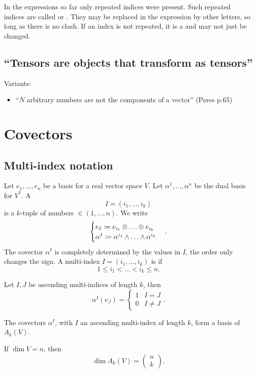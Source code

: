 In the expressions so far only repeated indices were present. Such repeated indices are called   or . They may be replaced in the expression by other letters, so long as there is no clash. If an index is not repeated, it is a  and may not just be changed.

\subsection{``Tensors are objects that transform as tensors''}
Variants:
\begin{itemize}
\item ``$N$ arbitrary numbers are not the components of a vector'' (Peres p.65)
\end{itemize}


\section{Covectors}

\subsection{Multi-index notation}
Let $e_1,\ldots, e_n$ be a basis for a real vector space $V$. Let $\alpha^1,\ldots, \alpha^n$ be the dual basis for $V^*$. A 
\[ I = (i_1,\ldots,i_k)\]
is a $k$-tuple of numbers $\in (1,\ldots,n)$. We write
\[ \begin{cases}
e_I \coloneqq e_{i_1}\otimes\ldots\otimes e_{i_k}\\
\alpha^I \coloneqq \alpha^{i_1}\wedge\ldots \wedge\alpha^{i_k}
\end{cases}. \]
The covector $\alpha^I$ is completely determined by the values in $I$, the order only changes the sign. A multi-index $I = (i_1,\ldots,i_k)$ is  if
\[ 1\leq i_1<\ldots<i_k\leq n. \]
\begin{proposition}
Let $I,J$ be ascending multi-indices of length $k$, then
\[ \alpha^I(e_J) = \begin{cases}
1 & I=J \\ 0& I\neq J
\end{cases}. \]
\end{proposition}
\begin{proposition}
The covectors $\alpha^I$, with $I$ an ascending multi-index of length $k$, form a basis of $A_k(V)$.
\end{proposition}
\begin{corollary}
If $\dim V=n$, then
\[ \dim A_k(V) = \begin{pmatrix}
n\\k
\end{pmatrix}. \]
\end{corollary}

